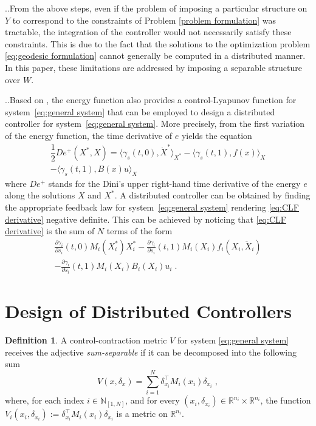 \documentclass[10pt,twocolumn,twoside]{IEEEtran}
\newcounter{para}
\newcommand\mypara{\par \thesection.\refstepcounter{para}\thepara.\space}
\theoremstyle{plain}
\theoremstyle{definition}
\newtheorem{definition}{Definition}
\theoremstyle{remark}
\begin{document}
\mypara From the above steps, even if the problem of imposing a particular structure on $Y$ to correspond to the constraints of Problem \ref{problem formulation} was tractable, the integration of the controller would not necessarily satisfy these constraints. This is due to the fact that the solutions to the optimization problem \eqref{eq:geodesic formulation} cannot generally be computed in a distributed manner. In this paper, these limitations are addressed by imposing a separable structure over $W$.

\mypara Based on \cite{Manchester2014a}, the energy function also provides a control-Lyapunov function for system~\eqref{eq:general system} that can be employed to design a distributed controller for system~\eqref{eq:general system}. More precisely, from the first variation of the energy function, the time derivative of $e$ yields the equation
\begin{align}
	\dfrac{1}{2}De^+(X^\ast,X)=\langle \gamma_s(t,0),\dot{X}^\ast\rangle_{X^\ast}-\langle \gamma_s(t,1),f(x)\rangle_{X}\nonumber\\
	-\langle \gamma_s(t,1),B(x)u\rangle_{X}\,\label{eq:CLF derivative}
\end{align}
where $De^+$ stands for the Dini's upper right-hand time derivative of the energy $e$ along the solutions $X$ and $X^\ast$. A distributed controller can be obtained by finding the appropriate feedback law for system~\eqref{eq:general system} rendering \eqref{eq:CLF derivative} negative definite. This can be achieved by noticing that \eqref{eq:CLF derivative} is the sum of $N$ terms of the form
\begin{align*}
	\tfrac{\partial \gamma_i}{\partial s_i}(t,0)M_i(X_i^\ast)X_i^\ast-\tfrac{\partial \gamma_i}{\partial s_i}(t,1)M_i(X_i)f_i(X_i,\breve{X}_i)\\
	-\tfrac{\partial \gamma_i}{\partial s_i}(t,1)M_i(X_i)B_i(X_i)u_i\;.
\end{align*}

\section{Design of Distributed Controllers}\label{sec:Design of Decentralized Controllers}

\begin{definition}\label{def:SSCCM}
	A control-contraction metric $V$ for system \eqref{eq:general system} receives the adjective \emph{sum-separable} if it can be decomposed into the following sum
	\begin{equation*}
		V(x,\delta_x)=\sum_{i=1}^N \delta_{x_i}^\top M_i(x_i)\delta_{x_i}\;,
	\end{equation*}
	where, for each index $i\in\mathbb{N}_{[1,N]}$, and for every $(x_i,\delta_{x_i})\in\mathbb{R}^{n_i}\times\mathbb{R}^{n_i}$, the function $V_i(x_i,\delta_{x_i}):=\delta_{x_i}^\top M_i(x_i)\delta_{x_i}$ is a metric on $\mathbb{R}^{n_i}$.
\end{definition}
\end{document}

